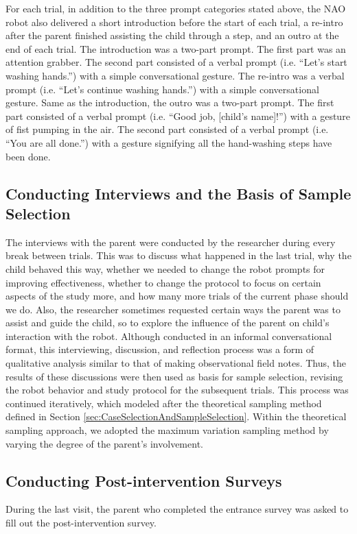 \documentclass{ut-thesis}
\begin{document}
For each trial, in addition to the three prompt categories stated above, the NAO robot also delivered a short introduction before the start of each trial, a re-intro after the parent finished assisting the child through a step, and an outro at the end of each trial. The introduction was a two-part prompt. The first part was an attention grabber. The second part consisted of a verbal prompt (i.e. “Let's start washing hands.”) with a simple conversational gesture. The re-intro was a verbal prompt (i.e. “Let's continue washing hands.”) with a simple conversational gesture. Same as the introduction, the outro was a two-part prompt. The first part consisted of a verbal prompt (i.e. “Good job, [child's name]!”) with a gesture of fist pumping in the air. The second part consisted of a verbal prompt (i.e. “You are all done.”) with a gesture signifying all the hand-washing steps have been done.

\subsection{Conducting Interviews and the Basis of Sample Selection}
\label{sec:ConductingInterviews}
The interviews with the parent were conducted by the researcher during every break between trials.  This was to discuss what happened in the last trial, why the child behaved this way, whether we needed to change the robot prompts for improving effectiveness, whether to change the protocol to focus on certain aspects of the study more, and how many more trials of the current phase should we do.  Also, the researcher sometimes requested certain ways the parent was to assist and guide the child, so to explore the influence of the parent on child's interaction with the robot.  Although conducted in an informal conversational format, this interviewing, discussion, and reflection process was a form of qualitative analysis similar to that of making observational field notes.  Thus, the results of these discussions were then used as basis for sample selection, revising the robot behavior and study protocol for the subsequent trials.  This process was continued iteratively, which modeled after the theoretical sampling method defined in Section \ref{sec:CaseSelectionAndSampleSelection}.  Within the theoretical sampling approach, we adopted the maximum variation sampling method by varying the degree of the parent's involvement.

\subsection{Conducting Post-intervention Surveys}
During the last visit, the parent who completed the entrance survey was asked to fill out the post-intervention survey.
\end{document}
